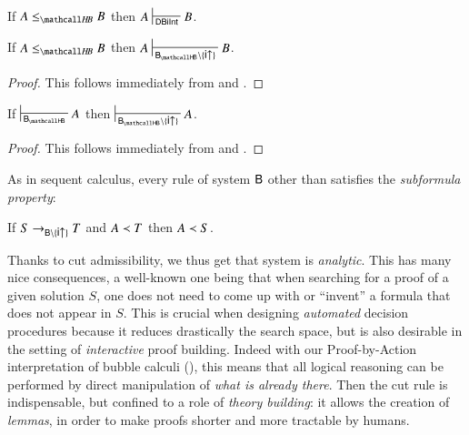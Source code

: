 \begin{fact}
  If $A \sementHB B$ then $A \prov{\msys{DBiInt}} B$.
\end{fact}

\begin{theorem}
  If $A \sementHB B$ then $A \prov{\sysBHB \setminus \{\rsf{i{\uparrow}}\}} B$.
\end{theorem}
\begin{proof}
  This follows immediately from  and
  .
\end{proof}

\begin{corollary}\label{cor:cut-admissibility}

  If $\prov{\sysBHB} A$ then $\prov{\sysBHB \setminus \{\rsf{i{\uparrow}}\}} A$.
\end{corollary}
\begin{proof}
  This follows immediately from  and
  .
\end{proof}

As in sequent calculus, every rule of system $\sysB$ other than
 satisfies the \emph{subformula property}:

\begin{fact}\label{cor:subformula-property}
  If $S \step_{\sysB \setminus \{\rsf{i{\uparrow}}\}} T$ and $A \prec T$ then
  $A \prec S$.
\end{fact}

Thanks to cut admissibility, we thus get that system  is \emph{analytic}.
This has many nice consequences, a well-known one being that when searching for
a proof of a given solution $S$, one does not need to come up with or ``invent''
a formula that does not appear in $S$. This is crucial when designing
\emph{automated} decision procedures because it reduces drastically the search
space, but is also desirable in the setting of \emph{interactive} proof
building. Indeed with our Proof-by-Action interpretation of bubble calculi
(), this means that all logical reasoning can be performed
by direct manipulation of \emph{what is already there}. Then the cut rule is
indispensable, but confined to a role of \emph{theory building}: it allows the
creation of \emph{lemmas}, in order to make proofs shorter and more tractable by
humans.

